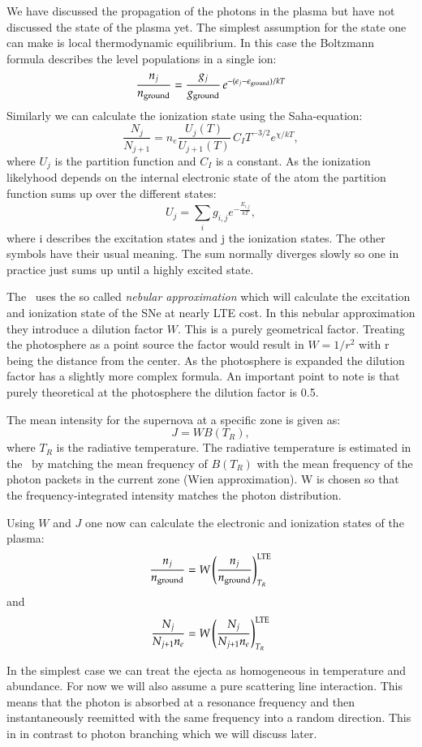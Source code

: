 We have discussed the propagation of the photons in the plasma but have not discussed the state of the plasma yet. The simplest assumption for the state one can make is local thermodynamic equilibrium. In this case the Boltzmann formula describes the level populations in a single ion:
\[
\frac{n_j}{n_{\rm ground}} = \frac{g_j}{g_{\rm ground}}\,e^{-(\epsilon_j - \epsilon_{\rm ground})/kT}
\]
Similarly we can calculate the ionization state using the Saha-equation:
\[
	\frac{N_j}{N_{j+1}} = n_e \frac{U_j(T)}{U_{j+1}(T)}\,C_I T^{-3/2} e^{\chi/kT},
\]
where $U_j$ is the partition function and $C_I$ is a constant. As the ionization likelyhood depends on the internal electronic state of the atom the partition function sums up over the different states:
\[
U_j = \sum_i g_{i,j} e^{-\frac{E_{i,j}}{kT}},
\]
where i describes the excitation states and j the ionization states. The other symbols have their usual meaning. 
The sum normally diverges slowly so one in practice just sums up until a highly excited state.

The \mlc\ uses the so called \textit{nebular approximation} which will calculate the excitation and ionization state of the SNe at nearly LTE cost. In this nebular approximation they introduce a dilution factor $W$. This is a purely geometrical factor. Treating the photosphere as a point source the factor would result in $W=1/r^2$ with r being the distance from the center. As the photosphere is expanded the dilution factor has a slightly more complex formula. An important point to note is that purely theoretical at the photosphere the dilution factor is 0.5.

The mean intensity for the supernova at a specific zone is given as:
\[
J = W B(T_R),
\]
where $T_R$ is the radiative temperature. The radiative temperature is estimated in the \mlc\ by matching the mean frequency of $B(T_R)$ with the mean frequency of the photon packets in the current zone (Wien approximation). W is chosen so that the frequency-integrated intensity matches the photon distribution. 

Using $W$ and $J$ one now can calculate the electronic and ionization states of the plasma:
\[
\frac{n_j}{n_{\rm ground}} = W \left( \frac{n_j}{n_{\rm ground}} \right) _{T_R}^{\rm LTE}
\]
and 
\[
\frac{N_j}{N_{j+1}n_e} = W \left( \frac{N_j}{N_{j+1}n_e} \right) _{T_R}^{\rm LTE}
\]


In the simplest case we can treat the ejecta as homogeneous in temperature and abundance. For now we will also assume a pure scattering line interaction. This means that the photon is absorbed at a resonance frequency and then instantaneously reemitted with the same frequency into a random direction. This in in contrast to photon branching which we will discuss later. 


